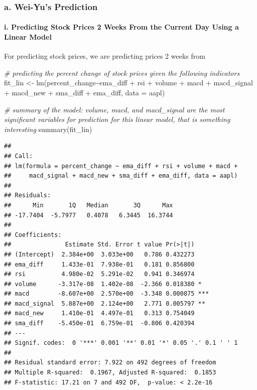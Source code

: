 \documentclass[
]{article}
\newenvironment{Shaded}{\begin{snugshade}}{\end{snugshade}}
\newcommand{\AttributeTok}[1]{\textcolor[rgb]{0.77,0.63,0.00}{#1}}
\newcommand{\CommentTok}[1]{\textcolor[rgb]{0.56,0.35,0.01}{\textit{#1}}}
\newcommand{\FunctionTok}[1]{\textcolor[rgb]{0.00,0.00,0.00}{#1}}
\newcommand{\NormalTok}[1]{#1}
\newcommand{\OtherTok}[1]{\textcolor[rgb]{0.56,0.35,0.01}{#1}}
\newcommand{\SpecialCharTok}[1]{\textcolor[rgb]{0.00,0.00,0.00}{#1}}
\begin{document}
\hypertarget{a.-wei-yus-prediction}{%
\subsubsection{\texorpdfstring{\textbf{a. Wei-Yu's
Prediction}}{a. Wei-Yu's Prediction}}\label{a.-wei-yus-prediction}}

\hypertarget{i.-predicting-stock-prices-2-weeks-from-the-current-day-using-a-linear-model}{%
\paragraph{i. Predicting Stock Prices 2 Weeks From the Current Day Using
a Linear
Model}\label{i.-predicting-stock-prices-2-weeks-from-the-current-day-using-a-linear-model}}

For predicting stock prices, we are predicting prices 2 weeks from

\begin{Shaded}
\begin{Highlighting}[]
\CommentTok{\# predicting the percent change of stock prices given the following indicators}
\NormalTok{fit\_lin }\OtherTok{\textless{}{-}} \FunctionTok{lm}\NormalTok{(percent\_change}\SpecialCharTok{\textasciitilde{}}\NormalTok{ema\_diff }\SpecialCharTok{+}\NormalTok{ rsi }\SpecialCharTok{+}\NormalTok{ volume }\SpecialCharTok{+}\NormalTok{ macd }\SpecialCharTok{+}\NormalTok{ macd\_signal }\SpecialCharTok{+}\NormalTok{ macd\_new }\SpecialCharTok{+}\NormalTok{ sma\_diff }\SpecialCharTok{+}\NormalTok{ ema\_diff, }\AttributeTok{data =}\NormalTok{ aapl)}

\CommentTok{\# summary of the model: volume, macd, and macd\_signal are the most significant variables for prediction for this linear model, that is something interesting}
\FunctionTok{summary}\NormalTok{(fit\_lin)}
\end{Highlighting}
\end{Shaded}

\begin{verbatim}
## 
## Call:
## lm(formula = percent_change ~ ema_diff + rsi + volume + macd + 
##     macd_signal + macd_new + sma_diff + ema_diff, data = aapl)
## 
## Residuals:
##      Min       1Q   Median       3Q      Max 
## -17.7404  -5.7977   0.4078   6.3445  16.3744 
## 
## Coefficients:
##               Estimate Std. Error t value Pr(>|t|)    
## (Intercept)  2.384e+00  3.033e+00   0.786 0.432273    
## ema_diff     1.433e-01  7.938e-01   0.181 0.856800    
## rsi          4.980e-02  5.291e-02   0.941 0.346974    
## volume      -3.317e-08  1.402e-08  -2.366 0.018380 *  
## macd        -8.607e+00  2.570e+00  -3.348 0.000875 ***
## macd_signal  5.887e+00  2.124e+00   2.771 0.005797 ** 
## macd_new     1.410e-01  4.497e-01   0.313 0.754049    
## sma_diff    -5.450e-01  6.759e-01  -0.806 0.420394    
## ---
## Signif. codes:  0 '***' 0.001 '**' 0.01 '*' 0.05 '.' 0.1 ' ' 1
## 
## Residual standard error: 7.922 on 492 degrees of freedom
## Multiple R-squared:  0.1967, Adjusted R-squared:  0.1853 
## F-statistic: 17.21 on 7 and 492 DF,  p-value: < 2.2e-16
\end{verbatim}
\end{document}
